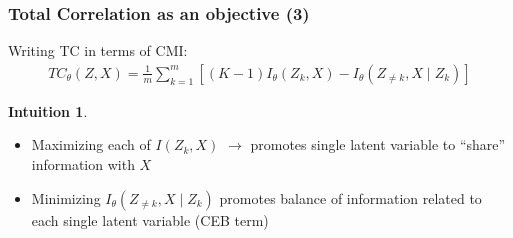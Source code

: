 \documentclass{beamer}
\theoremstyle{definition}
\newtheorem{intuition}{Intuition}
\begin{document}
    \begin{frame}
      \frametitle{Total Correlation as an objective (3)}
      Writing TC in terms of CMI:
      \begin{align*}
        TC_{\theta}(Z, X) = \frac{1}{m}\sum_{k = 1}^{m}\left[ (K-1) I_{\theta}(Z_{k}, X) - I_{\theta}(Z_{\neq k}, X \mid Z_{k})\right]
      \end{align*}
      \begin{intuition}
       \begin{itemize}
         \item Maximizing each of $I(Z_{k}, X)$ $\to$ promotes single latent variable to \enquote{share} information with $X$
         \item Minimizing $I_{\theta}(Z_{\neq k}, X \mid Z_{k})$ promotes balance of information related to each single latent variable (CEB term)
       \end{itemize}
      \end{intuition}
    \end{frame}
\end{document}
